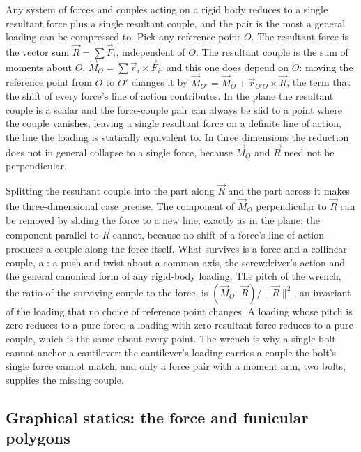 \begin{mastery}
Any system of forces and couples acting on a rigid body reduces to a single
resultant force plus a single resultant couple, and the pair is the most a
general loading can be compressed to. Pick any reference point $O$. The
resultant force is the vector sum $\vec{R} = \sum \vec{F}_i$, independent of
$O$. The resultant couple is the sum of moments about $O$,
$\vec{M}_O = \sum \vec{r}_i \times \vec{F}_i$, and this one does depend on
$O$: moving the reference point from $O$ to $O'$ changes it by
$\vec{M}_{O'} = \vec{M}_O + \vec{r}_{O'O} \times \vec{R}$, the term that the
shift of every force's line of action contributes. In the plane the resultant
couple is a scalar and the force-couple pair can always be slid to a point
where the couple vanishes, leaving a single resultant force on a definite
line of action, the line the loading is statically equivalent to. In three
dimensions the reduction does not in general collapse to a single force,
because $\vec{M}_O$ and $\vec{R}$ need not be perpendicular.

Splitting the resultant couple into the part along $\vec{R}$ and the part
across it makes the three-dimensional case precise. The component of
$\vec{M}_O$ perpendicular to $\vec{R}$ can be removed by sliding the force to
a new line, exactly as in the plane; the component parallel to $\vec{R}$
cannot, because no shift of a force's line of action produces a couple along
the force itself. What survives is a force and a collinear couple, a
: a push-and-twist about a common axis, the screwdriver's
action and the general canonical form of any rigid-body loading. The pitch of
the wrench, the ratio of the surviving couple to the force, is
$(\vec{M}_O \cdot \vec{R})/\lVert \vec{R} \rVert^2$, an invariant of the
loading that no choice of reference point changes. A loading whose pitch is
zero reduces to a pure force; a loading with zero resultant force reduces to a
pure couple, which is the same about every point. The wrench is why a single
bolt cannot anchor a cantilever: the cantilever's loading carries a couple the
bolt's single force cannot match, and only a force pair with a moment arm, two
bolts, supplies the missing couple.
\end{mastery}

\subsection{Graphical statics: the force and funicular polygons}

